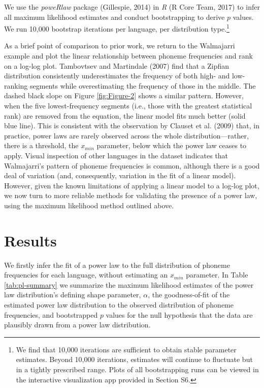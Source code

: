 We use the \emph{poweRlaw} package (Gillespie, 2014) in \emph{R} (R Core Team, 2017) to infer all maximum likelihood estimates and conduct bootstrapping to derive \(p\) values. We run 10,000 bootstrap iterations per language, per distribution type.\footnote{We find that 10,000 iterations are sufficient to obtain stable parameter estimates. Beyond 10,000 iterations, estimates will continue to fluctuate but in a tightly prescribed range. Plots of all bootstrapping runs can be viewed in the interactive visualization app provided in Section S6.}

As a brief point of comparison to prior work, we return to the Walmajarri example and plot the linear relationship between phoneme frequencies and rank on a log-log plot. Tambovtsev and Martindale (2007) find that a Zipfian distribution consistently underestimates the frequency of both high- and low-ranking segments while overestimating the frequency of those in the middle. The dashed black slope on Figure \ref{fig:Figure-2} shows a similar pattern. However, when the five lowest-frequency segments (i.e., those with the greatest statistical rank) are removed from the equation, the linear model fits much better (solid blue line). This is consistent with the observation by Clauset et al. (2009) that, in practice, power laws are rarely observed across the whole distribution---rather, there is a threshold, the \(x_{min}\) parameter, below which the power law ceases to apply. Visual inspection of other languages in the dataset indicates that Walmajarri's pattern of phoneme frequencies is common, although there is a good deal of variation (and, consequently, variation in the fit of a linear model). However, given the known limitations of applying a linear model to a log-log plot, we now turn to more reliable methods for validating the presence of a power law, using the maximum likelihood method outlined above.

\hypertarget{results}{%
\section*{Results}\label{results}}

We firstly infer the fit of a power law to the full distribution of phoneme frequencies for each language, without estimating an \(x_{min}\) parameter. In Table \ref{tab:pl-summary} we summarize the maximum likelihood estimates of the power law distribution's defining shape parameter, \(\alpha\), the goodness-of-fit of the estimated power law distribution to the observed distribution of phoneme frequencies, and bootstrapped \(p\) values for the null hypothesis that the data are plausibly drawn from a power law distribution.


